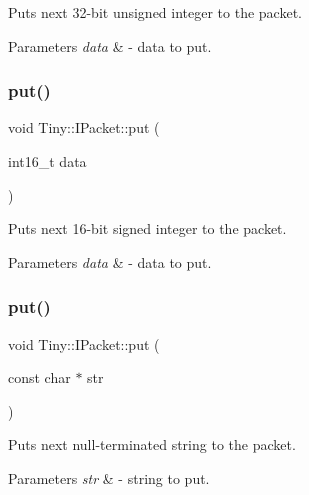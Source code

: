 Puts next 32-\/bit unsigned integer to the packet. 
\begin{DoxyParams}{Parameters}
{\em data} & -\/ data to put. \\
\hline
\end{DoxyParams}
\mbox{\label{classTiny_1_1IPacket_abf21aef6652da2e975c8be13e6a643e9}} 
\subsubsection{\texorpdfstring{put()}{put()}\hspace{0.1cm}{\footnotesize\ttfamily [5/7]}}
{\footnotesize\ttfamily void Tiny\+::\+I\+Packet\+::put (\begin{DoxyParamCaption}\item[{int16\+\_\+t}]{data }\end{DoxyParamCaption})\hspace{0.3cm}{\ttfamily [inline]}}

Puts next 16-\/bit signed integer to the packet. 
\begin{DoxyParams}{Parameters}
{\em data} & -\/ data to put. \\
\hline
\end{DoxyParams}
\mbox{\label{classTiny_1_1IPacket_a46eaf3eb0232288dfb36ce7cc01b12e5}} 
\subsubsection{\texorpdfstring{put()}{put()}\hspace{0.1cm}{\footnotesize\ttfamily [6/7]}}
{\footnotesize\ttfamily void Tiny\+::\+I\+Packet\+::put (\begin{DoxyParamCaption}\item[{const char $\ast$}]{str }\end{DoxyParamCaption})\hspace{0.3cm}{\ttfamily [inline]}}

Puts next null-\/terminated string to the packet. 
\begin{DoxyParams}{Parameters}
{\em str} & -\/ string to put. \\
\hline
\end{DoxyParams}
\mbox{\label{classTiny_1_1IPacket_a5ebc1e6507e7255a8babddbae82dcb2a}} 
